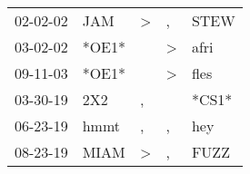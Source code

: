 \begin{supertabular}{lllll}
 02-02-02 &    JAM &  \textgreater &             , &   STEW \\
 03-02-02 &  *OE1* &               &  \textgreater &   afri \\
 09-11-03 &  *OE1* &               &  \textgreater &   fles \\
 03-30-19 &    2X2 &             , &               &  *CS1* \\
 06-23-19 &   hmmt &             , &             , &    hey \\
 08-23-19 &   MIAM &  \textgreater &             , &   FUZZ \\
\end{supertabular}
